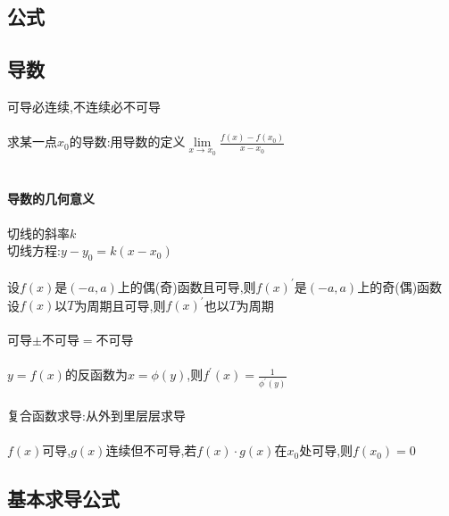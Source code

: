 \documentclass{article}
\begin{document}
\begin{flushleft}
	\LARGE
	
	\section{公式}
	
	\subsection{导数}
	
	可导必连续,不连续必不可导\\
	~\\
	求某一点$x_0$的导数:用导数的定义$\lim\limits_{x\to x_0} \frac{f(x)-f(x_0
		)}{x-x_0}$\\
	~\\
	\paragraph{导数的几何意义}
	切线的斜率$k$\\
	切线方程:$y-y_0=k(x-x_0)$\\
	~\\
	设$f(x)$是$(-a,a)$上的偶(奇)函数且可导,则$f(x)^{'}$是$(-a,a)$上的奇(偶)函数\\
	设$f(x)$以$T$为周期且可导,则$f(x)^{'}$也以$T$为周期\\
	~\\
	可导$\pm$不可导$=$不可导\\
	~\\
	$y=f(x)$的反函数为$x=\phi(y)$,则$f^{'}(x)=\frac{1}{\phi^{'}(y)}$\\
	~\\
	复合函数求导:从外到里层层求导\\
	~\\
	$f(x)$可导,$g(x)$连续但不可导,若$f(x)\cdot g(x)$在$x_0$处可导,则$f(x_0)=0$\\
	
	\subsection{基本求导公式}
	

\end{flushleft}
\end{document}
